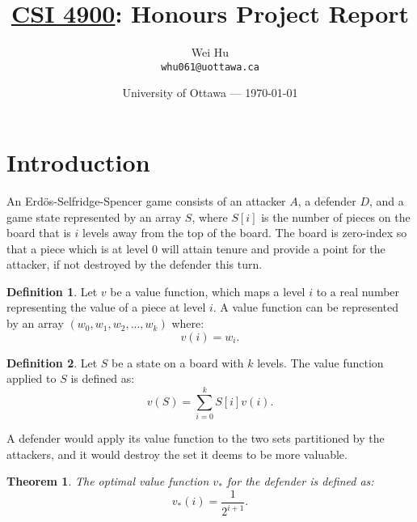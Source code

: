 \documentclass{article}
\title{\underline{CSI 4900}: Honours Project Report} %
\author{Wei Hu\\ \texttt{whu061@uottawa.ca}} %
\date{University of Ottawa --- \today} %
\theoremstyle{plain}
\newtheorem{thm}{Theorem}[section]
\theoremstyle{definition}
\newtheorem{defn}{Definition}[section]
\theoremstyle{remark}
\begin{document}
\maketitle %


\section{Introduction} %

An Erd\"os-Selfridge-Spencer game consists of an attacker $A$, a defender $D$, and a game state represented by an array $S$, where $S[i]$ is the number of pieces on the board that is $i$ levels away from the top of the board. The board is zero-index so that a piece which is at level $0$ will attain tenure and provide a point for the attacker, if not destroyed by the defender this turn.

\begin{defn}
  Let $v$ be a value function, which maps a level $i$ to a real number representing the value of a piece at level $i$. A value function can be represented by an array $(w_{0}, w_{1}, w_{2}, ... , w_{k})$ where:
  \begin{equation*}
    v(i) = w_{i}.
  \end{equation*}
\end{defn}

\begin{defn}
  Let $S$ be a state on a board with $k$ levels. The value function applied to $S$ is defined as:
  \begin{equation*}
    v(S) = \sum_{i = 0}^k S[i]v(i).
  \end{equation*}
\end{defn}

A defender would apply its value function to the two sets partitioned by the attackers, and it would destroy the set it deems to be more valuable.

\begin{thm}
  The optimal value function $v_{*}$ for the defender is defined as:
  \begin{equation}
    v_{*}(i) = \frac{1}{2^{i+1}}.
  \end{equation}
\end{thm}
\end{document}
